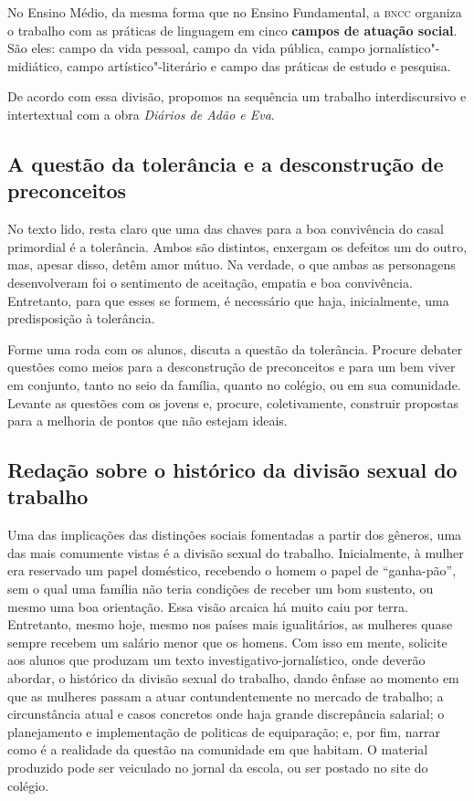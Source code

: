 \documentclass[12pt]{extarticle}
\begin{document}
No Ensino Médio, da mesma forma que no Ensino Fundamental, a \textsc{bncc}
organiza o trabalho com as práticas de linguagem em cinco \textbf{campos
de atuação social}. São eles: campo da vida pessoal, campo da vida
pública, campo jornalístico"-midiático, campo artístico"-literário e campo
das práticas de estudo e pesquisa.

De acordo com essa divisão, propomos na sequência um trabalho
interdiscursivo e intertextual com a obra \emph{Diários de Adão e Eva}.

\subsection{A questão da tolerância e a desconstrução de preconceitos}


No texto lido, resta claro que uma das chaves para a boa convivência
do casal primordial é a tolerância. Ambos são distintos, enxergam os
defeitos um do outro, mas, apesar disso, detêm amor mútuo. Na verdade,
o que ambas as personagens desenvolveram foi o sentimento de
aceitação, empatia e boa convivência. Entretanto, para que esses se
formem, é necessário que haja, inicialmente, uma predisposição à
tolerância.

Forme uma roda com os alunos, discuta a questão da tolerância. Procure
debater questões como meios para a desconstrução de preconceitos e para
um bem viver em conjunto, tanto no seio da família, quanto no colégio,
ou em sua comunidade. Levante as questões com os jovens e, procure,
coletivamente, construir propostas para a melhoria de pontos que não
estejam ideais.

\subsection{Redação sobre o histórico da divisão sexual do trabalho}

Uma das implicações das distinções sociais fomentadas a partir dos
gêneros, uma das mais comumente vistas é a divisão sexual do trabalho.
Inicialmente, à mulher era reservado um papel doméstico, recebendo o
homem o papel de ``ganha-pão'', sem o qual uma família não teria
condições de receber um bom sustento, ou mesmo uma boa orientação.
Essa visão arcaica há muito caiu por terra. Entretanto, mesmo hoje,
mesmo nos países mais igualitários, as mulheres quase sempre recebem
um salário menor que os homens. Com isso em mente, solicite aos alunos
que produzam um texto investigativo-jornalístico, onde deverão
abordar, o histórico da divisão sexual do trabalho, dando ênfase ao
momento em que as mulheres passam a atuar contundentemente no mercado
de trabalho; a circunstância atual e casos concretos onde haja grande
discrepância salarial; o planejamento e implementação de politicas de
equiparação; e, por fim, narrar como é a realidade da questão na
comunidade em que habitam. O material produzido pode ser veiculado no
jornal da escola, ou ser postado no site do colégio.
\end{document}
